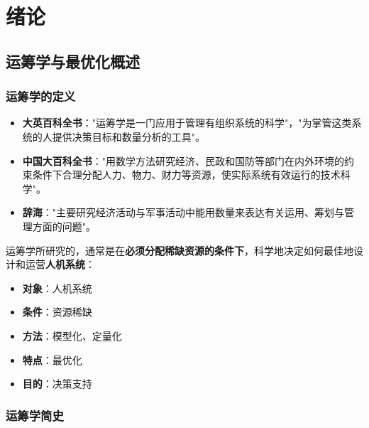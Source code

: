 \chapter{绪论}\label{chap:intro}
\section{运筹学与最优化概述}\label{sec:overview}

\subsection{运筹学的定义}

\begin{conceptbox}[运筹学的各种定义]
\begin{itemize}[itemsep=0.3em]
    \item \textbf{大英百科全书}："运筹学是一门应用于管理有组织系统的科学"，"为掌管这类系统的人提供决策目标和数量分析的工具"。
    \item \textbf{中国大百科全书}："用数学方法研究经济、民政和国防等部门在内外环境的约束条件下合理分配人力、物力、财力等资源，使实际系统有效运行的技术科学"。
    \item \textbf{辞海}："主要研究经济活动与军事活动中能用数量来表达有关运用、筹划与管理方面的问题"。
\end{itemize}
\end{conceptbox}

\begin{property}[运筹学的核心特征]
运筹学所研究的，通常是在\textbf{必须分配稀缺资源的条件下}，科学地决定如何最佳地设计和运营\textbf{人机系统}：
\begin{itemize}[itemsep=0.2em]
    \item \textbf{对象}：人机系统
    \item \textbf{条件}：资源稀缺
    \item \textbf{方法}：模型化、定量化
    \item \textbf{特点}：最优化
    \item \textbf{目的}：决策支持
\end{itemize}
\end{property}

\subsection{运筹学简史}

